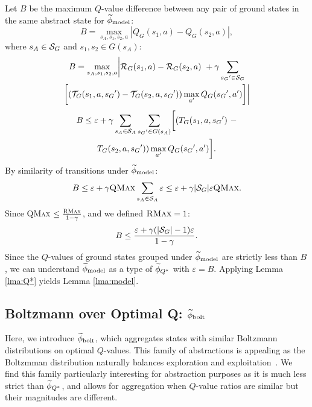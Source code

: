 Let $B$ be the maximum $Q$-value difference between any pair of ground states in the same abstract state for $\widetilde \phi_{\text{model}}$:
\begin{equation*}
B = \max_{s_A, s_1, s_2, a}  |Q_G(s_1, a) - Q_G(s_2, a)|,
\end{equation*}
where $s_A \in \mathcal{S}_G$ and $s_1, s_2 \in G(s_A)$:
\begin{multline*}
B=\max_{s_A, s_1, s_2, a}      \biggl|\mathcal{R}_G(s_1, a) - \mathcal{R}_G(s_2, a)\ + \gamma \sum_{{s_G}' \in \mathcal{S}_G} \\
\biggl[(\mathcal{T}_G(s_1,a,{s_G}') -\mathcal{T}_G(s_2, a, {s_G}'))\max_{a'}Q_G({s_G}', a')\biggr]\biggr|
\end{multline*}
\begin{multline*}
B\leq \varepsilon + \gamma \sum_{s_A \in \mathcal{S}_A}\sum_{{s_G}' \in G(s_A)} \biggl[(T_G(s_1, a, {s_G}')\ -\\ 
T_G(s_2, a, {s_G}')) \max_{a'}Q_G({s_G}', a') \biggr].
\end{multline*}
By similarity of transitions under $\widetilde \phi_{\text{model}}$:
\begin{align*}
B \leq \varepsilon + \gamma \textsc{QMax} \sum_{s_A \in \mathcal{S}_A} \varepsilon \leq \varepsilon + \gamma|\mathcal{S}_G|\varepsilon \textsc{QMax}.
\end{align*}
Since \textsc{QMax} $\leq \frac{\textsc{RMax}}{1-\gamma}$, and we defined $\textsc{RMax} = 1$:
\begin{equation*}
B \leq \frac{\varepsilon + \gamma(|\mathcal{S}_G| - 1) \varepsilon}{1-\gamma}.
\end{equation*}
Since the $Q$-values of ground states grouped under $\widetilde \phi_{\text{model}}$ are strictly less than $B$, we can understand $\widetilde \phi_{\text{model}}$ as a type of $\widetilde \phi_{Q^*}$ with $\varepsilon = B$. Applying Lemma \ref{lma:Q*} yields Lemma \ref{lma:model}.
\subsection{Boltzmann over Optimal Q: $\widetilde \phi_{\text{bolt}}$}
\label{sec:boltz}

Here, we introduce $\widetilde \phi_{\text{bolt}}$, which aggregates states with similar Boltzmann distributions on optimal $Q$-values. This family of abstractions is appealing as the Boltzmman distribution naturally balances exploration and exploitation~\cite{sutton1998reinforcement}. We find this family particularly interesting for abstraction purposes as it is much less strict than $\widetilde \phi_{Q^*}$, and allows for aggregation when $Q$-value ratios are similar but their magnitudes are different.

